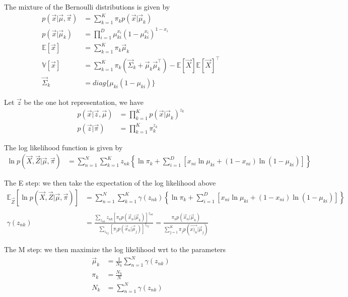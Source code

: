 \documentclass[12pt,twoside]{article}
\begin{document}
The mixture of the Bernoulli distributions is given by
\begin{align*}
p(\vec{x}\vert \vec{\mu}, \vec{\pi})&=\sum_{k=1}^K \pi_kp(\vec{x}\vert \vec{\mu}_k)\\
p(\vec{x}\vert \vec{\mu}_k) &= \prod^{D}_{i=1} \mu_{ki}^{x_i} (1- \mu_{ki}^{x_i})^{1-x_i}\\
\mathbb{E}[\vec{x}] & = \sum_{k=1}^K \pi_k\vec{\mu}_k\\
\mathbb{V}[\vec{x}] &= \sum_{k=1}^K \pi_k \left(\vec{\Sigma}_k + \vec{\mu}_k\vec{\mu}_k^\top\right) - \mathbb{E}[\vec{X}]\mathbb{E}[\vec{X}]^\top\\
\vec{\Sigma}_k & = diag\lbrace \mu_{ki}(1-\mu_{ki})\rbrace
\end{align*}

Let $\vec{z}$ be the one hot representation, we have
\begin{align*}
p(\vec{x} \vert \vec{z}, \vec{\mu}) &= \prod_{k=1}^K p(\vec{x}\vert \vec{\mu}_k)^{z_k}\\
p(\vec{z}\vert \vec{\pi}) &= \prod_{k=1}^K \pi_k^{z_k}
\end{align*}

The log likelihood function is given by
\begin{align*}
\ln p(\vec{X}, \vec{Z} \vert \vec{\mu}, \vec{\pi})&=\sum_{n=1}^N\sum_{k=1}^Kz_{nk}
\left\lbrace 
\ln \pi_k +\sum_{i=1}^D[x_{ni}\ln\mu_{ki}+(1-x_{ni})\ln(1-\mu_{ki})]
\right\rbrace
\end{align*}

The E step: we then take the expectation of the log likelihood above
\begin{align*}
\mathbb{E}_{\vec{Z}}[\ln p(\vec{X}, \vec{Z} \vert \vec{\mu}, \vec{\pi})]&=\sum_{n=1}^N\sum_{k=1}^K\gamma(z_{nk})
\left\lbrace 
\ln \pi_k +\sum_{i=1}^D[x_{ni}\ln\mu_{ki}+(1-x_{ni})\ln(1-\mu_{ki})]
\right\rbrace\\
&\\
\gamma(z_{nk})& = \frac{\sum_{z_{nk}} z_{nk}[\pi_kp(\vec{x}_n\vert \vec{\mu}_k)]^{z_{nk}} }{\sum_{z_{nj}}[\pi_jp(\vec{x}_n\vert \vec{\mu}_j)]^{z_{nj}}}
=\frac{\pi_kp(\vec{x}_n\vert \vec{\mu}_k)}{\sum_{j=1}^K \pi_jp(\vec{x)_n}\vert \vec{\mu}_j)}
\end{align*}

The M step: we then maximize the log likelihood wrt to the parameters
\begin{align*}
\vec{\mu}_k &=\frac{1}{N_k}\sum_{n=1}^N \gamma(z_{nk})\\
\pi_k&=\frac{N_k}{N}\\
N_k &= \sum_{n=1}^N \gamma(z_{nk})
\end{align*}
\end{document}
